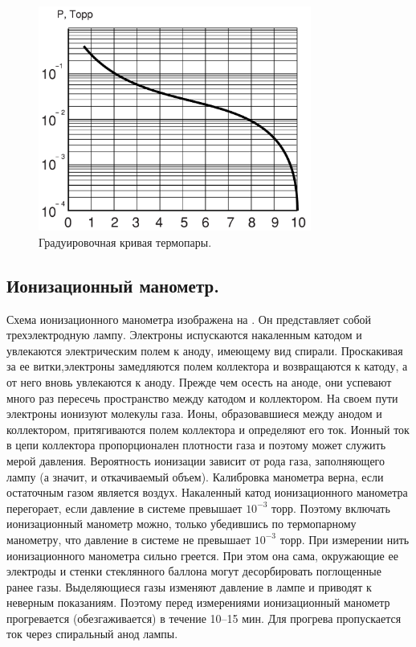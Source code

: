 \documentclass[a4paper,12pt]{article}
\begin{document}
\begin{figure}[H]
\begin{minipage}{0.8\textwidth}
    \centering
    \includegraphics[width=0.8\textwidth]{data/ТМ_кривая.png}
    \caption{Градуировочная кривая термопары.\label{graph:M}}
  \end{minipage}\hfill
\end{figure}

\subsection{Ионизационный манометр.}
Схема ионизационного манометра изображена на .
Он представляет собой трехэлектродную лампу. Электроны испускаются накаленным катодом и увлекаются электрическим полем к аноду, имеющему вид спирали. Проскакивая за ее витки,электроны замедляются полем коллектора и возвращаются к катоду, а от него вновь увлекаются к аноду.
Прежде чем осесть на аноде, они успевают много раз пересечь пространство между катодом и коллектором.
На своем пути электроны ионизуют молекулы газа. Ионы, образовавшиеся между анодом и коллектором, притягиваются полем коллектора и определяют его ток.
Ионный ток в цепи коллектора пропорционален плотности газа и поэтому может служить мерой давления.
Вероятность ионизации зависит от рода газа, заполняющего лампу (а значит, и откачиваемый объем).
Калибровка манометра верна, если остаточным газом является воздух. Накаленный катод ионизационного манометра перегорает, если давление в системе превышает $10^{-3}$ торр.
Поэтому включать ионизационный манометр можно, только убедившись по термопарному манометру, что давление в системе не превышает $10^{-3}$ торр.
При измерении нить ионизационного манометра сильно греется. При этом она сама, окружающие ее электроды и стенки стеклянного баллона могут десорбировать поглощенные ранее газы.
Выделяющиеся газы изменяют давление в лампе и приводят к неверным показаниям. Поэтому перед измерениями ионизационный манометр прогревается (обезгаживается) в течение 10–15 мин. Для прогрева пропускается ток через спиральный анод лампы.
\end{document}
